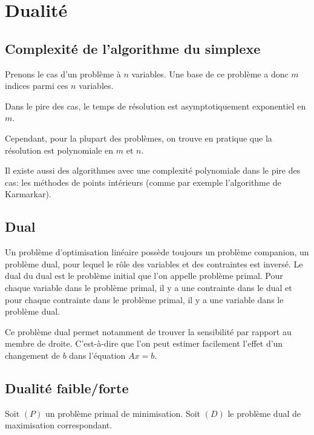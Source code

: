 \section{Dualité}

\subsection{Complexité de l'algorithme du simplexe}

Prenons le cas d'un problème à $n$ variables.
Une base de ce problème a donc $m$ indices
parmi ces $n$ variables.

Dans le pire des cas, le temps de résolution est
asymptotiquement exponentiel en $m$.

Cependant, pour la plupart des problèmes,
on trouve en pratique que la résolution est polynomiale
en $m$ et $n$.

Il existe aussi des algorithmes avec
une complexité polynomiale dans le pire des cas:
les méthodes de points intérieurs
(comme par exemple l'algorithme de Karmarkar).

\subsection{Dual}

Un problème d’optimisation linéaire
possède toujours un problème companion, un problème dual,
pour lequel le rôle des variables et des contraintes est inversé.
Le dual du dual est le problème initial
que l’on appelle problème primal.
Pour chaque variable dans le problème primal,
il y a une contrainte dans le dual
et pour chaque contrainte dans le problème primal,
il y a une variable dans le problème dual.

Ce problème dual permet notamment de trouver
la sensibilité par rapport au membre de droite.
C'est-à-dire que l'on peut estimer facilement
l'effet d'un changement de $b$ dans l'équation
$Ax = b$.

\subsection{Dualité faible/forte}

Soit $(P)$ un problème primal de minimisation.
Soit $(D)$ le problème dual de maximisation correspondant.

